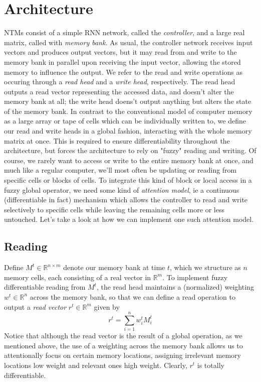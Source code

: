 \documentclass{article}
\begin{document}
\section{Architecture}
NTMs consist of a simple RNN network, called the \textit{controller}, and a large real matrix, called with \textit{memory bank}. As usual, the controller network receives input vectors and produces output vectors, but it may read from and write to the memory bank in parallel upon receiving the input vector, allowing the stored memory to influence the output. We refer to the read and write operations as occuring through a \textit{read head} and a \textit{write head}, respectively. The read head outputs a read vector representing the accessed data, and doesn't alter the memory bank at all; the write head doens't output anything but alters the state of the memory bank. In contrast to the conventional model of computer memory as a large array or tape of cells which can be individually written to, we define our read and write heads in a global fashion, interacting with the whole memory matrix at once. This is required to ensure differentiability throughout the architecture, but forces the architecture to rely on "fuzzy" reading and writing. Of course, we rarely want to access or write to the entire memory bank at once, and much like a regular computer, we'll most often be updating or reading from specific cells or blocks of cells. To integrate this kind of block or local access in a fuzzy global operator, we need some kind of \textit{attention model}, ie a continuous (differentiable in fact) mechanism which allows the controller to read and write selectively to specific cells while leaving the remaining cells more or less untouched. Let's take a look at how we can implement one such attention model.

\subsection{Reading}
Define $ M^t \in \mathbb{R}^{n \times m} $ denote our memory bank at time $ t $, which we structure as $ n $ memory cells, each consisting of a real vector in $ \mathbb{R}^m $. To implement fuzzy differentiable reading from $ M^t $, the read head maintains a (normalized) weighting $ w^t \in \mathbb{R}^n $ across the memory bank, so that we can define a read operation to output a \textit{read vector} $ r^t \in \mathbb{R}^m $ given by
$$ r^t = \sum_{i = 1}^n w_i^t M_i^t $$
Notice that although the read vector is the result of a global operation, as we mentioned above, the use of a weighting across the memory bank allows us to attentionally focus on certain memory locations, assigning irrelevant memory locations low weight and relevant ones high weight. Clearly, $ r^t $ is totally differentiable.
\end{document}
